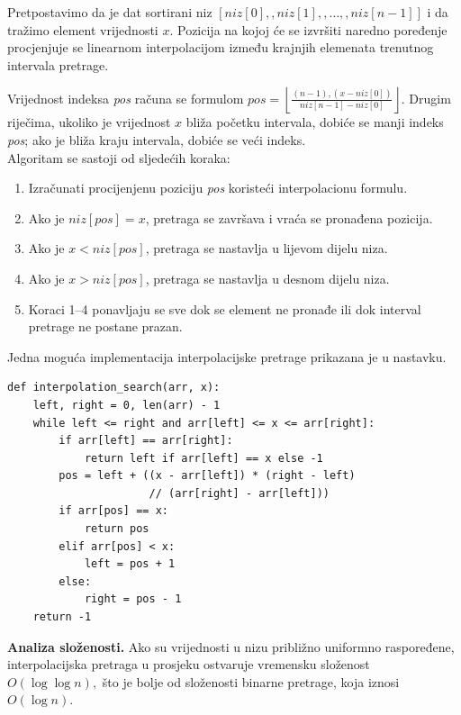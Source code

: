 Pretpostavimo da je dat sortirani niz $[ niz[0],, niz[1],, \ldots,, niz[n-1] ]$ i da tražimo element vrijednosti $x$. Pozicija na kojoj će se izvršiti naredno poređenje procjenjuje se linearnom interpolacijom između krajnjih elemenata trenutnog intervala pretrage.

Vrijednost indeksa \textit{pos} računa se formulom $
pos=
\left\lfloor
\frac{(n-1),(x-niz[0])}
{niz[n-1]-niz[0]}
\right\rfloor .
$ Drugim riječima, ukoliko je vrijednost $x$ bliža početku intervala, dobiće se manji indeks \textit{pos}; ako je bliža kraju intervala, dobiće se veći indeks.\\

Algoritam se sastoji od sljedećih koraka:

\begin{enumerate}
	\item Izračunati procijenjenu poziciju \textit{pos} koristeći interpolacionu formulu.
	
	\item Ako je $niz[pos] = x$, pretraga se završava i vraća se pronađena pozicija.
	
	\item Ako je $x < niz[pos]$, pretraga se nastavlja u lijevom dijelu niza.
	
	\item Ako je $x > niz[pos]$, pretraga se nastavlja u desnom dijelu niza.
	
	\item Koraci 1--4 ponavljaju se sve dok se element ne pronađe ili dok interval pretrage ne postane prazan.
	
\end{enumerate}

Jedna moguća implementacija interpolacijske pretrage prikazana je u nastavku.

\begin{verbatim}
def interpolation_search(arr, x):
    left, right = 0, len(arr) - 1
    while left <= right and arr[left] <= x <= arr[right]:
        if arr[left] == arr[right]:
            return left if arr[left] == x else -1
        pos = left + ((x - arr[left]) * (right - left)
                      // (arr[right] - arr[left]))
        if arr[pos] == x:
            return pos
        elif arr[pos] < x:
            left = pos + 1
        else:
            right = pos - 1
    return -1
\end{verbatim}

\textbf{Analiza složenosti.} Ako su vrijednosti u nizu približno uniformno raspoređene, interpolacijska pretraga u prosjeku ostvaruje vremensku slože\-nost $O(\log\log n),$ što je bolje od složenosti binarne pretrage, koja iznosi $O(\log n)$.


